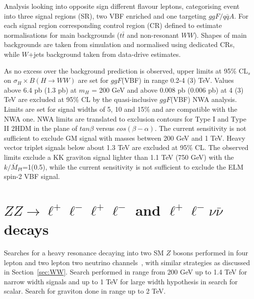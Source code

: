 \documentclass{PoS}
\begin{document}
Analysis looking into opposite sign different flavour leptons, categorising event into three signal regions (SR), two VBF enriched and one targeting $ggF/q\bar{q}A$. For each signal region corresponding control region (CR) defined to estimate normalisations for main backgrounds ($t\bar{t}$ and non-resonant $WW$). 
Shapes of main backgrounds are taken from simulation and normalised using dedicated CRs, while $W$+jets background taken from data-drive estimates.

As no excess over the background prediction is observed, upper limits at 95\% CL$_s$ on $\sigma_H \times B(H\rightarrow WW)$ are set for $ggF$(VBF) in range 0.2-4 (3) TeV. 
Values above 6.4 pb (1.3 pb) at $m_H$ = 200 GeV and above 0.008 pb (0.006 pb) at 4 (3) TeV are excluded at 95\% CL by the quasi-inclusive $ggF$(VBF) NWA analysis.
Limits are set for signal widths of 5, 10 and 15\% and are compatible with the NWA one.
NWA limits are translated to exclusion contours  for Type I and Type II 2HDM in the plane of $tan \beta$ versus $cos(\beta-\alpha)$.
The current sensitivity is not sufficient to exclude GM signal with masses between 200 GeV and 1 TeV.
Heavy vector triplet signals below about 1.3 TeV are excluded at 95\% CL. 
The observed limits exclude a KK graviton signal lighter than 1.1 TeV (750 GeV) with the $k/\overline{M}_{Pl}$=1(0.5), while the current sensitivity is not sufficient to exclude the ELM spin-2 VBF signal. 

\section{$ZZ\rightarrow \ell^+\ell^-\ell^+\ell^-$ and $\ell^+\ell^-\nu\bar{\nu}$ decays} %
\label{sec:ZZ}
Searches for a heavy resonance decaying into two SM $Z$ bosons performed in four lepton and two lepton two neutrino channels~\cite{HIGG-2016-19}, with similar strategies as discussed in Section~\ref{sec:WW}. Search performed in range from 200 GeV up to 1.4 TeV for narrow width signals and up to 1 TeV for large width hypothesis in search for scalar. Search for graviton done in range up to 2 TeV.
\end{document}
